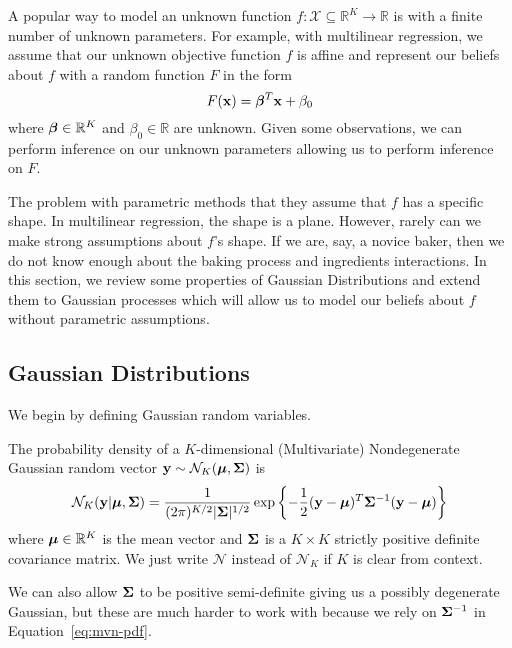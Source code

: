 A popular way to model an unknown function $f: \mathcal{X} \subseteq \mathbb{R}^{K} \to \mathbb{R}$
is with a finite number of unknown parameters.
For example, with multilinear regression,
we assume that our unknown objective function $f$ is affine and represent our beliefs about $f$ with a random function $F$ in the form
\begin{equation*}
    F(\mathbf{x}) = \boldsymbol{\beta}^{T} \mathbf{x} + \beta_0
\end{equation*}
where $\boldsymbol{\beta} \in \mathbb{R}^{K}$ and $\beta_0 \in \mathbb{R}$ are unknown.
Given some observations, we can perform inference on our unknown parameters
allowing us
to perform inference on $F$.

The problem with parametric methods that they assume that $f$ has a specific shape.
In multilinear regression, the shape is a plane.
However, rarely can we make strong assumptions about $f$'s shape.
If we are, say, a novice baker, then we do not know enough about the baking process and ingredients interactions.
In this section, we review some properties of Gaussian Distributions and extend them to Gaussian processes which will allow us to model our beliefs about $f$ without parametric assumptions.

\subsection{Gaussian Distributions}\label{ssec:gaus}

We begin by defining Gaussian random variables.
\begin{definition}
    The probability density of a $K$-dimensional (Multivariate) Nondegenerate Gaussian random vector $\mathbf{y} \sim \mathcal{N}_K(\boldsymbol{\mu}, \boldsymbol{\Sigma})$
    is
    \begin{equation}
        \label{eq:mvn-pdf}
        \mathcal{N}_K(\mathbf{y} | \boldsymbol{\mu}, \boldsymbol{\Sigma}) = \frac{ 1 }{ (2 \pi)^{K/2} \lvert \boldsymbol{\Sigma} \rvert^{1/2} } \exp \left\{ -\frac12 (\mathbf{y} - \boldsymbol{\mu})^{T} \boldsymbol{\Sigma}^{-1} (\mathbf{y} - \boldsymbol{\mu})  \right\}
    \end{equation}
    where $\boldsymbol{\mu} \in \mathbb{R}^{K}$ is the mean vector and $\boldsymbol{\Sigma}$ is a $K \times K$ strictly positive definite covariance matrix.
    We just write $\mathcal{N}$ instead of $\mathcal{N}_K$ if $K$ is clear from context.
\end{definition}
We can also allow $\boldsymbol{\Sigma}$ to be positive semi-definite giving us a possibly degenerate Gaussian, but these are much harder to work with because we rely on $\boldsymbol{\Sigma}^{-1}$ in Equation~\ref{eq:mvn-pdf}.

